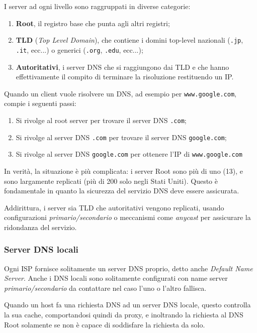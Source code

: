 \documentclass[a4paper,11pt]{article}
\begin{document}
I server ad ogni livello sono raggruppati in diverse categorie:
\begin{enumerate}
	\item \textbf{Root}, il registro base che punta agli altri registri;
	\item \textbf{TLD} (\textit{Top Level Domain}), che contiene i domini top-level nazionali (\lstinline|.jp|, \lstinline|.it|, ecc...) o generici (\lstinline|.org|, \lstinline|.edu|, ecc...);
	\item \textbf{Autoritativi}, i server DNS che si raggiungono dai TLD e che hanno effettivamente il compito di terminare la risoluzione restituendo un IP.
\end{enumerate}

Quando un client vuole risolvere un DNS, ad esempio per \lstinline|www.google.com|, compie i seguenti passi:
\begin{enumerate}
	\item Si rivolge al root server per trovare il server DNS \lstinline|.com|;
	\item Si rivolge al server DNS \lstinline|.com| per trovare il server DNS \lstinline|google.com|;
	\item Si rivolge al server DNS \lstinline|google.com| per ottenere l'IP di \lstinline|www.google.com|
\end{enumerate}

In verità, la situazione è più complicata: i server Root sono più di uno (13), e sono largamente replicati (più di 200 solo negli Stati Uniti). Questo è fondamentale in quanto la sicurezza del servizio DNS deve essere assicurata.

Addirittura, i server sia TLD che autoritativi vengono replicati, usando configurazioni \textit{primario/secondario} o meccanismi come \textit{anycast} per assicurare la ridondanza del servizio.

\subsubsection{Server DNS locali}
Ogni ISP fornisce solitamente un server DNS proprio, detto anche \textit{Default Name Server}.
Anche i DNS locali sono solitamente configurati con name server \textit{primario/secondario} da contattare nel caso l'uno o l'altro fallisca. 

Quando un host fa una richiesta DNS ad un server DNS locale, questo controlla la sua cache, comportandosi quindi da proxy, e inoltrando la richiesta al DNS Root solamente se non è capace di soddisfare la richiesta da solo.
\end{document}
